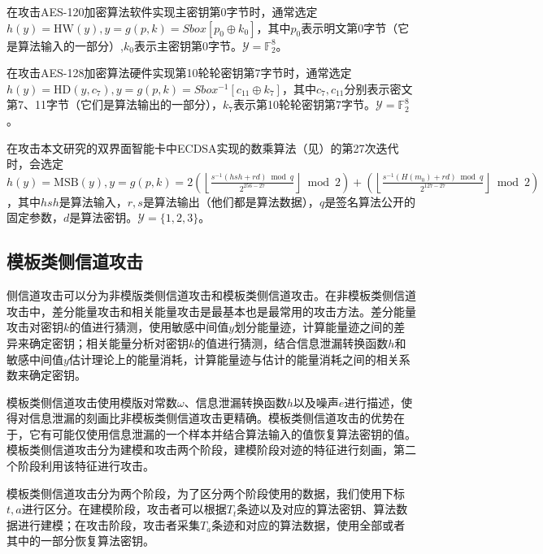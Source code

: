 {	\begin{example}\label{ex:aessw}
		在攻击AES-120加密算法软件实现主密钥第0字节时，通常选定$h(y)=\mathrm{HW}(y), y=g(p,k)=Sbox[p_0\oplus k_0]$，其中$p_0$表示明文第0字节（它是算法输入的一部分）,$k_0$表示主密钥第0字节。$\mathcal Y=\mathbb F_2^8$。
	\end{example}

	\begin{example}
		在攻击AES-128加密算法硬件实现第10轮轮密钥第7字节时，通常选定$h(y)=\mathrm{HD}(y,c_7), y=g(p,k)=Sbox^{-1}[c_{11}\oplus k_{7}]$，其中$c_7,c_{11}$分别表示密文第7、11字节（它们是算法输出的一部分），$k_7$表示第10轮轮密钥第7字节。$\mathcal Y=\mathbb F_2^8$。
	\end{example}

	\begin{example}\label{ex:ecdsa}
		在攻击本文研究的双界面智能卡中ECDSA实现的数乘算法（见）的第27次迭代时，会选定$h(y)=\mathrm{MSB}(y), y=g(p,k)=2\left( \left\lfloor \frac{s^{-1}(hsh+rd)\bmod q}{2^{256-27}}\right\rfloor \bmod 2\right)+\left( \left\lfloor \frac{s^{-1}(H(m_0)+rd)\bmod q}{2^{127-27}}\right\rfloor\bmod 2\right) $，其中$hsh$是算法输入，$r,s$是算法输出（他们都是算法数据），$q$是签名算法公开的固定参数，$d$是算法密钥。$\mathcal Y=\{1,2,3\}$。
	\end{example}
	\subsection{模板类侧信道攻击}
	
	侧信道攻击可以分为非模版类侧信道攻击和模板类侧信道攻击。在非模板类侧信道攻击中，差分能量攻击\citep{KocherJJ99, Messerges00, BevanK02}和相关能量攻击\citep{Brier04}是最基本也是最常用的攻击方法。差分能量攻击对密钥$k$的值进行猜测，使用敏感中间值$y$划分能量迹，计算能量迹之间的差异来确定密钥；相关能量分析对密钥$k$的值进行猜测，结合信息泄漏转换函数$h$和敏感中间值$y$估计理论上的能量消耗，计算能量迹与估计的能量消耗之间的相关系数来确定密钥。
	
	模板类侧信道攻击使用模版对常数$\omega$、信息泄漏转换函数$h$以及噪声$e$进行描述，使得对信息泄漏的刻画比非模板类侧信道攻击更精确。模板类侧信道攻击的优势在于，它有可能仅使用信息泄漏的一个样本并结合算法输入的值恢复算法密钥的值。模板类侧信道攻击分为建模和攻击两个阶段，建模阶段对迹的特征进行刻画，第二个阶段利用该特征进行攻击\citep{Mangard07}。
	
	模板类侧信道攻击分为两个阶段，为了区分两个阶段使用的数据，我们使用下标$t,a$进行区分。在建模阶段，攻击者可以根据$T_t$条迹以及对应的算法密钥、算法数据进行建模；在攻击阶段，攻击者采集$T_a$条迹和对应的算法数据，使用全部或者其中的一部分恢复算法密钥。
	
}
